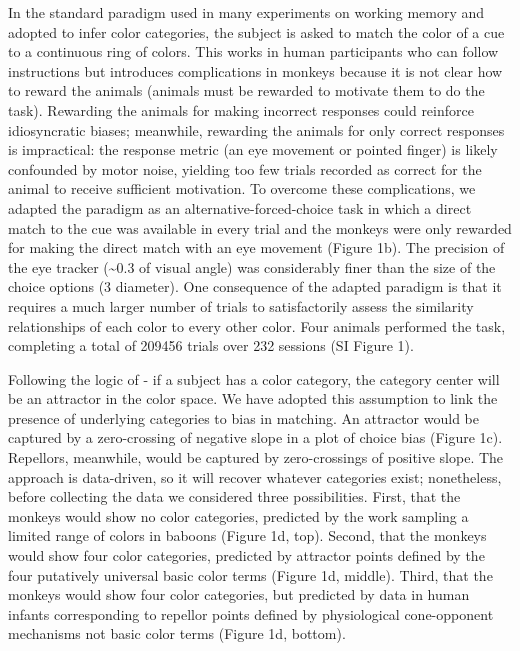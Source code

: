 \documentclass[9pt,biorxiv,lineno,onehalfspacing]{lapreprint}
\begin{document}
\begin{refsection}
In the standard paradigm used in many experiments on working memory and adopted to infer color categories, the subject is asked to match the color of a cue to a continuous ring of colors. This works in human participants who can follow instructions but introduces complications in monkeys because it is not clear how to reward the animals (animals must be rewarded to motivate them to do the task). Rewarding the animals for making incorrect responses could reinforce idiosyncratic biases; meanwhile, rewarding the animals for only correct responses is impractical: the response metric (an eye movement or pointed finger) is likely confounded by motor noise, yielding too few trials recorded as correct for the animal to receive sufficient motivation. To overcome these complications, we adapted the paradigm as an alternative-forced-choice task in which a direct match to the cue was available in every trial and the monkeys were only rewarded for making the direct match with an eye movement (Figure 1b). 
The precision of the eye tracker (\textasciitilde0.3\degree{} of visual angle) was considerably finer than the size of the choice options (3\degree{} diameter). 
One consequence of the adapted paradigm is that it requires a much larger number of trials to satisfactorily assess the similarity relationships of each color to every other color. 
Four animals performed the task, completing a total of 209456 trials over 232 sessions (SI Figure 1).

Following the logic of \citet{bae_why_2015} - if a subject has a color category, the category center will be an attractor in the color space. We have adopted this assumption to link the presence of underlying categories to bias in matching. 
An attractor would be captured by a zero-crossing of negative slope in a plot of choice bias (Figure 1c). 
Repellors, meanwhile, would be captured by zero-crossings of positive slope. 
The approach is data-driven, so it will recover whatever categories exist; nonetheless, before collecting the data we considered three possibilities. 
First, that the monkeys would show no color categories, predicted by the work sampling a limited range of colors in baboons \citep{davidoff_cross-species_2010} (Figure 1d, top). 
Second, that the monkeys would show four color categories, predicted by attractor points defined by the four putatively universal basic color terms (Figure 1d, middle). 
Third, that the monkeys would show four color categories, but predicted by data in human infants corresponding to repellor points defined by physiological cone-opponent mechanisms not basic color terms \citep{skelton_biological_2017} (Figure 1d, bottom).


\end{refsection}
\end{document}
